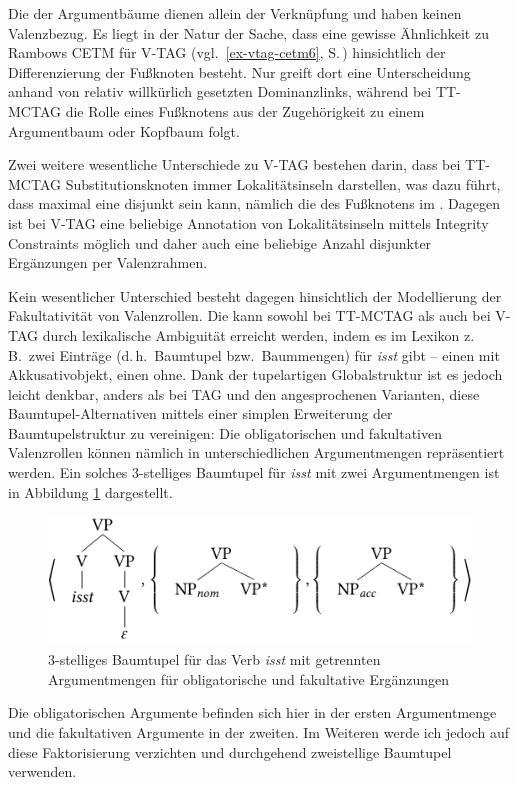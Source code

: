 Die  der Argumentbäume dienen allein der Verknüpfung und haben keinen Valenzbezug. Es liegt in der Natur der Sache, dass eine gewisse Ähnlichkeit zu Rambows CETM für V-TAG (vgl.\ \ref{ex-vtag-cetm6}, S.\,\pageref{ex-vtag-cetm6}) hinsichtlich der Differenzierung der Fu\ss knoten besteht. Nur greift dort  eine Unterscheidung anhand von relativ willkürlich gesetzten Dominanzlinks, während bei TT-MCTAG die Rolle eines Fu\ss knotens aus der Zugehörigkeit zu einem Argumentbaum oder Kopfbaum folgt.   

Zwei weitere wesentliche Unterschiede zu V-TAG bestehen darin, dass bei TT-MCTAG Substitutionsknoten immer Lokalitätsinseln darstellen, was dazu führt, dass maximal eine  disjunkt sein kann, nämlich die des Fu\ss knotens im . Dagegen ist bei V-TAG eine beliebige Annotation von Lokalitätsinseln mittels Integrity Constraints möglich und daher auch eine beliebige Anzahl disjunkter Ergänzungen per Valenzrahmen.

Kein wesentlicher Unterschied besteht dagegen hinsichtlich der Modellierung der Fakultativität von Valenzrollen. Die kann sowohl bei TT-MCTAG als auch bei V-TAG durch lexikalische Ambiguität erreicht werden, indem es im Lexikon z.\,B.\ zwei Einträge (d.\,h.\ Baumtupel bzw.\ Baummengen) für {\it isst} gibt -- einen mit Akkusativobjekt, einen ohne. Dank der tupelartigen Globalstruktur ist es jedoch leicht denkbar, anders als bei TAG und den angesprochenen Varianten, diese Baumtupel-Alternativen mittels einer simplen Erweiterung der Baumtupelstruktur zu vereinigen: Die obligatorischen und fakultativen Valenzrollen können nämlich in unterschiedlichen Argumentmengen repräsentiert werden. Ein solches 3-stelliges Baumtupel für {\it isst} mit zwei Argumentmengen ist in Abbildung \ref{fig-ttmctag-3tupel} dargestellt. 
\begin{figure}[t]
\centering
\includegraphics{graphics/abb74.pdf}
\caption{\label{fig-ttmctag-3tupel}3-stelliges Baumtupel für das Verb {\it isst} mit getrennten Argumentmengen für obligatorische und fakultative Ergänzungen}
\end{figure} 
Die obligatorischen Argumente befinden sich hier in der ersten Argumentmenge und die fakultativen Argumente in der zweiten. Im Weiteren werde ich jedoch auf diese Faktorisierung verzichten und durchgehend zweistellige Baumtupel verwenden.



